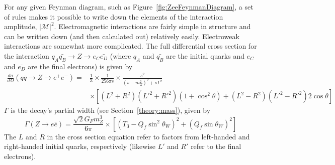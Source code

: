 

For any given Feynman diagram, 
such as Figure~\ref{fig:ZeeFeynmanDiagram}, 
a set of rules makes it possible to write 
down the elements of the interaction amplitude, 
$\left| \mathcal{M} \right| ^2$.  
Electromagnetic interactions are fairly 
simple in structure and can be written down 
(and then calculated out) relatively easily.  
Electroweak interactions are somewhat 
more complicated.  
The full differential cross section for the interaction 
$ q_A \bar{q_B} \rightarrow Z \rightarrow e_{C} \bar{e_{D}} $
(where $q_A$ and $\bar{q_B}$ are the initial quarks 
and $e_{C}$ and $\bar{e_{D}}$ are the final electrons) is given by 
\cite{PdgRpp}
\begin{align*}
\frac{d \sigma}{d \Omega} 
( q \bar{q} \rightarrow Z \rightarrow e^+ e^- ) 
= &\frac{1}{3} 
\times \frac{1}{256 \pi s} 
\times \frac{s^2}{(s - m_Z^2)^2 + s \Gamma^2} \\
&\times \left[(L^2 + R^2) (L'^2 + R'^2) (1 + \cos^2 \theta)
+ (L^2 - R^2) (L'^2 - R'^2) 2 \cos \theta \right]
\end{align*}
$\Gamma$ is the \Zee decay's 
partial width (see Section~\ref{theory:mass}), 
given by %
\[
\Gamma (Z \rightarrow e \bar{e} )
= \frac{ \sqrt{2} G_F m_Z^3 }{6 \pi}
\times \left[(T_3 - Q_f \sin^2 \theta_W )^2 
+ (Q_f \sin \theta_W )^2 \right]
\]
The $L$ and $R$ in the cross section equation 
refer to factors from %
left-handed and right-handed initial quarks, respectively 
(likewise $L'$ and $R'$ refer to the final electrons).  
